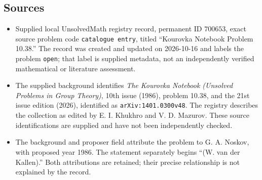 \documentclass[11pt]{article}
\begin{document}
\subsection{Sources}
\begin{itemize}
\item Supplied local UnsolvedMath registry record, permanent ID \(700653\), exact source problem code \texttt{catalogue entry}, titled ``Kourovka Notebook Problem 10.38.'' The record was created and updated on 2026-10-16 and labels the problem \texttt{open}; that label is supplied metadata, not an independently verified mathematical or literature assessment.
\item The supplied background identifies \emph{The Kourovka Notebook (Unsolved Problems in Group Theory)}, 10th issue (1986), problem 10.38, and the 21st issue edition (2026), identified as \texttt{arXiv:1401.0300v48}. The registry describes the collection as edited by E. I. Khukhro and V. D. Mazurov. These source identifications are supplied and have not been independently checked.
\item The background and proposer field attribute the problem to G. A. Noskov, with proposed year 1986. The statement separately begins ``(W. van der Kallen).'' Both attributions are retained; their precise relationship is not explained by the record.
\end{itemize}
\end{document}
